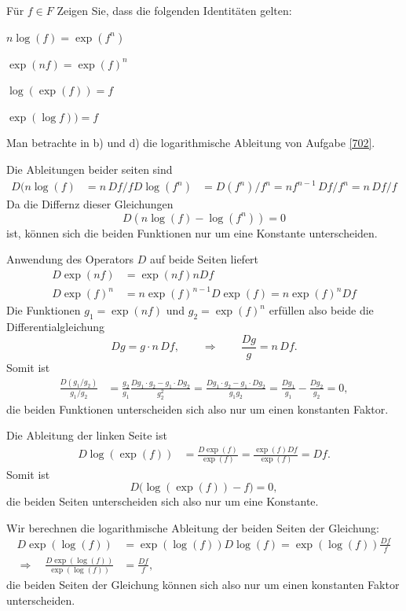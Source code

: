 Für $f\in F$ Zeigen Sie, dass die folgenden Identitäten gelten:
\begin{teilaufgaben}
\item $n\log(f) = \exp(f^n)$
\item $\exp(nf) = \exp(f)^n$
\item $\log(\exp(f)) = f$
\item $\exp(\log f)) = f$
\end{teilaufgaben}

\begin{hinweis}
Man betrachte in b) und d) die logarithmische Ableitung von Aufgabe
\ref{702}.
\end{hinweis}

\begin{loesung}
\begin{teilaufgaben}
\item
Die Ableitungen beider seiten sind
\begin{align*}
D(n\log(f) &= n\, Df/f
D\log(f^n) &= D(f^n)/f^n = nf^{n-1}\, Df/f^n = n\,Df/f
\end{align*}
Da die Differnz dieser Gleichungen
\[
D(n\log(f)-\log(f^n)) = 0
\]
ist, können sich die beiden Funktionen nur um eine Konstante unterscheiden.

\item
Anwendung des Operators $D$ auf beide Seiten liefert
\begin{align*}
D\exp(nf)  &= \exp(nf) n Df \\
D\exp(f)^n &= n \exp(f)^{n-1} D\exp(f) = n \exp(f)^n Df
\end{align*}
Die Funktionen $g_1=\exp(nf)$ und $g_2=\exp(f)^n$ erfüllen also beide
die Differentialgleichung
\[
Dg = g\cdot n\,Df,
\qquad\Rightarrow\qquad
\frac{Dg}{g} = n\,Df.
\]
Somit ist
\begin{align*}
\frac{D(g_1/g_2)}{g_1/g_2}
&=
\frac{g_2}{g_1}
\frac{Dg_1\cdot g_2-g_1\cdot Dg_2}{g_2^2}
=
\frac{Dg_1\cdot g_2 -g_1\cdot Dg_2}{g_1g_2}
=
\frac{Dg_1}{g_1} - \frac{Dg_2}{g_2}
=
0,
\end{align*}
die beiden Funktionen unterscheiden sich also nur um einen konstanten
Faktor.

\item
Die Ableitung der linken Seite ist
\begin{align*}
D\log(\exp(f)) &= \frac{D\exp(f)}{\exp(f)} = \frac{\exp(f) Df}{\exp(f)}=Df.
\end{align*}
Somit ist 
\[
D\bigl(\log(\exp(f)) - f\bigr) = 0,
\]
die beiden Seiten unterscheiden sich also nur um eine Konstante.

\item
Wir berechnen die logarithmische Ableitung der beiden Seiten der Gleichung:
\begin{align*}
D\exp(\log(f))
&=
\exp(\log(f)) D\log(f)
=
\exp(\log(f)) \frac{Df}{f}
\\
\Rightarrow\quad
\frac{D\exp(\log(f))}{\exp(\log(f))}
&=
\frac{Df}{f},
\end{align*}
die beiden Seiten der Gleichung können sich also nur um einen konstanten
Faktor unterscheiden.
\qedhere
\end{teilaufgaben}
\end{loesung}

